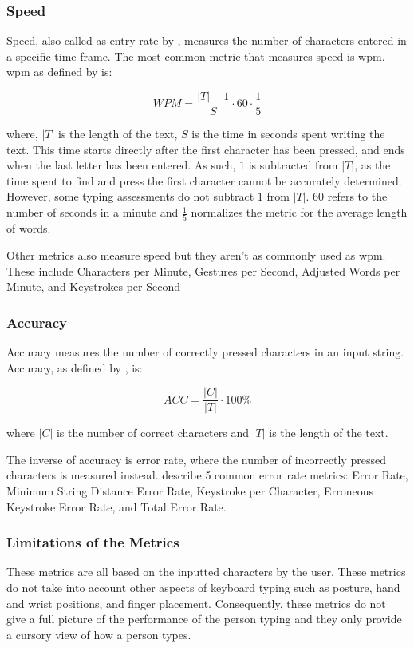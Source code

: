 \documentclass{report}
\begin{document}
\subsubsection{Speed}
Speed, also called as entry rate by \citeauthor{arif2009}, measures the number
of characters entered in a specific time frame. The most common metric that
measures speed is \ac{wpm}. \ac{wpm} as defined by \citeauthor{arif2009} is:

\begin{equation}
	WPM = \frac{|T| - 1}{S} \cdot 60 \cdot \frac{1}{5}
\end{equation}

where, $|T|$ is the length of the text, $S$ is the time in seconds spent writing
the text. This time starts directly after the first character has been pressed,
and ends when the last letter has been entered. As such, $1$ is subtracted from
$|T|$, as the time spent to find and press the first character cannot be
accurately determined. However, some typing assessments do not subtract $1$ from
$|T|$. $60$ refers to the number of seconds in a minute and $\frac{1}{5}$
normalizes the metric for the average length of words.


Other metrics also measure speed but they aren't as commonly used as \ac{wpm}.
These include Characters per Minute, Gestures per Second, Adjusted Words per
Minute, and Keystrokes per Second

\subsubsection{Accuracy}
Accuracy measures the number of correctly pressed characters in an input string.
Accuracy, as defined by \citeauthor{bartnik2021}, is:

\begin{equation}
	ACC = \frac{|C|}{|T|} \cdot 100\%
\end{equation}

where $|C|$ is the number of correct characters and $|T|$ is the length of the
text.

The inverse of accuracy is error rate, where the number of incorrectly pressed
characters is measured instead. \citeauthor{arif2009} describe 5 common error
rate metrics: Error Rate, Minimum String Distance Error Rate, Keystroke per
Character, Erroneous Keystroke Error Rate, and Total Error Rate.

\subsubsection{Limitations of the Metrics}
These metrics are all based on the inputted characters by the user. These
metrics do not take into account other aspects of keyboard typing such as
posture, hand and wrist positions, and finger placement. Consequently, these
metrics do not give a full picture of the performance of the person typing and
they only provide a cursory view of how a person types.
\end{document}
